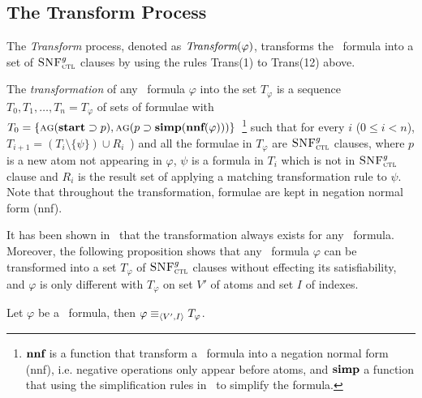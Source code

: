 \documentclass[letterpaper]{article}
\begin{document}
\subsection{The Transform Process}
The \emph{Transform} process, denoted as $\emph{Transform}(\varphi)$, transforms the \CTL\ formula into a set of ${\textsc{SNF}_{\textsc{ctl}}^g}$ clauses by using  the rules  Trans(1) to Trans(12) above.

The \emph{transformation} of any \CTL\ formula $\varphi$ into the set $T_{\varphi}$ is a sequence $T_0, T_1,\dots, T_n=T_{\varphi}$ of sets of formulae with $T_0=\{\textsc{a} \textsc{g}(\textbf{start} \supset p), \textsc{a} \textsc{g}(p \supset \textbf{simp}(\textbf{nnf}(\varphi)))\}$~\footnote{$\textbf{nnf}$ is a function that transform a \CTL\ formula into a negation normal form (nnf), i.e. negative operations only appear before atoms, and $\textbf{simp}$ a function that using the simplification rules in~\cite{zhang2009refined} to simplify the formula.} such that for every $i$ ($0 \leq i< n$), $T_{i+1} = (T_i \setminus \{\psi\}) \cup R_i$~\cite{zhang2009refined}) and all the formulae in $T_{\varphi}$ are ${\textsc{SNF}_{\textsc{ctl}}^g}$ clauses, where $p$ is a new atom not appearing in $\varphi$, $\psi$ is a formula in $T_i$ which is not in ${\textsc{SNF}_{\textsc{ctl}}^g}$ clause and $R_i$ is the result set of applying a matching transformation rule to $\psi$. Note that throughout the transformation, formulae are kept in negation normal form (nnf).

It has been shown in~\cite{zhang2009refined} that the transformation always exists for any \CTL\ formula. Moreover, the following proposition shows that any \CTL\ formula $\varphi$ can be transformed into a set $T_{\varphi}$ of ${\textsc{SNF}_{\textsc{ctl}}^g}$ clauses without effecting its satisfiability, and $\varphi$ is only different with $T_{\varphi}$ on set $V'$ of atoms and set $I$ of indexes.


\begin{proposition}\label{pro:TranE}
 Let $\varphi$ be a \CTL\ formula, then $\varphi \equiv_{{\langle{V', I}\rangle}} T_{\varphi}$.
\end{proposition}

\end{document}
